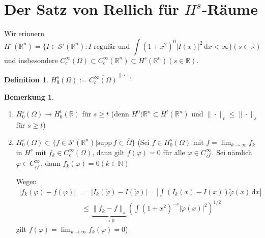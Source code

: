 \documentclass[
paper=a4,
bibtotocnumbered,
liststotocnumbered,
tablecaptionabove,
pointlessnumbers,
twoside,
openright,
10pt
]
{report}
\newcommand{\supp}{\mathrm{supp}\,}
\let\phi\varphi
\theoremstyle{definition}
\newtheorem*{df}{Definition}
\newtheorem*{rem}{Bemerkung}
\numberwithin{equation}{chapter}
\begin{document}
\section{Der Satz von Rellich für $H^s$-Räume}

Wir erinnern
\begin{equation}
H^s(\mathbb R^n) = \{I\in \mathcal S'(\mathbb R^n): I \text{ regulär und } \int (1+x^2)^0 |I(x)|^2\, \mathrm dx <\infty\} (s\in \mathbb R) 
\end{equation}
und insbesondere $C_c^\infty(\Omega) \subset C_c^\infty(\mathbb R^n) \subset H^s(\mathbb R^n) (s\in \mathbb R)$.

\begin{df}
$H_0^s(\Omega) := \overline{C_c^\infty(\Omega)}^{\|\cdot\|_s}$
\end{df}
\begin{rem}
\begin{enumerate}
\item $H_0^s(\Omega) \to H_0^t (\mathbb R)$ für $s\ge t$ (denn $H^0(\mathbb R^n\subset H^t(\mathbb R^n)$ und $\|\cdot \|_t \le \| \cdot \|_s$ für $s\ge t$)

\item $H_0^s(\Omega) \subset \{f\in \mathcal S'(\mathbb R^n)|\supp f\subset \overline{\Omega}\}$
(Sei $f\in H_0^s(\Omega)$ mit $f=\lim_{k\to \infty} f_k$ in $H^s$ mit $f_k \in C_c^\infty(\Omega)$, dann gilt $f(\phi)=0$ für alle $\phi \in C_{\overline{\Omega}^c}^\infty$. Sei nämlich $\phi \in C_{\overline{\Omega}^c}^\infty$, dann $f_k(\phi) =0 (k\in \mathbb N)$

Wegen 
\begin{align*}
|f_k(\phi)-f(\phi)| &=|I_k(\check \phi) - I(\check \phi)| = |\int (I_k(x)-I(x))\check \phi(x)\, \mathrm dx|\\
 &\le \underbrace{\|f_k-f\|_s}_{\to 0} \left ( \int (1+x^2)^{-s} |\check \phi(x)|^2 \right )^{1/2}
\end{align*}
gilt $f(\phi) = \lim_{k\to \infty} f_k(\phi) =0$)
\end{enumerate}
\end{rem}
\end{document}
